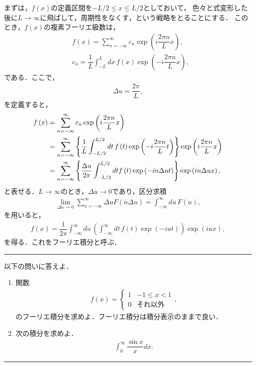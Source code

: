 まずは，$f(x)$の定義区間を$-L/2\leq x \leq L/2$としておいて，
色々と式変形した後に$L\to \infty$に飛ばして，周期性をなくす，という戦略をとることにする．
このとき，$f(x)$の複素フーリエ級数は，
\begin{align}
  &f\left(x\right) = \sum_{n=-\infty}^{\infty}c_n \exp\left(i\dfrac{2\pi n}{L}x\right), \\
  &c_n = \dfrac{1}{L}\int_{-L}^{L}dx\,f\left(x\right)\exp\left(-i\dfrac{2\pi n}{L}x\right),
\end{align}
である．ここで，
\begin{align}
  \Delta u = \dfrac{2\pi}{L},
\end{align}
を定義すると，
\begin{align}
 f\left(x\right) &= \sum_{n=-\infty}^{\infty}c_n \exp\left(i\dfrac{2\pi n}{L}x\right) \notag \\
                 &= \sum_{n=-\infty}^{\infty}\left\{\dfrac{1}{L}\int_{-L/2}^{L/2}dt\, f\left(t\right)
                             \exp\left(-i\dfrac{2\pi n}{L}t\right)\right\}\exp\left(i\dfrac{2\pi n}{L}x\right) \notag \\
                 &= \sum_{n=-\infty}^{\infty}\left\{\dfrac{\Delta u}{2\pi}\int_{-L/2}^{L/2}dt 
                        f\left(t\right)\exp\left(-in\Delta u t\right)\right\}\exp\left(in\Delta u x\right),
\end{align}
と表せる．$L\to \infty$のとき，$\Delta u \to 0$であり，区分求積
\begin{align}
 \lim_{\Delta u\to 0} \sum_{n=-\infty}^{\infty}\Delta u F\left(n\Delta u\right) = \int_{-\infty}^{\infty}du\,F\left(u\right),
\end{align}
を用いると，
\begin{align}
 f\left(x\right) = \dfrac{1}{2\pi}\int_{-\infty}^{\infty}du\,
                   \left(\int_{-\infty}^{\infty}dt\,f\left(t\right)\exp\left(-iut\right)\right)\exp\left(iux\right),
                   \label{fourier_integral}
\end{align}
を得る．これをフーリエ積分と呼ぶ．
%
\newpage
%
\hrule
\reidai
以下の問いに答えよ．
\begin{enumerate}[(1)]
  \item 関数
	\begin{align}
	  f\left(x\right) =
	  \begin{cases}
	    1 & -1\leq x < 1 \\
	    0 & それ以外
	  \end{cases},
	\end{align}
	のフーリエ積分を求めよ．フーリエ積分は積分表示のままで良い．
  \item 次の積分を求めよ．
	\begin{align}
	  \int_0^{\infty}\dfrac{\sin x}{x}dx. 
	\end{align}
\end{enumerate}
\hrule

